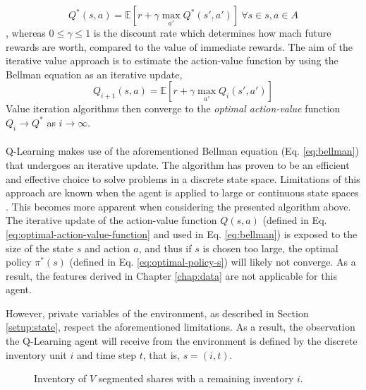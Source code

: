 \begin{equation}\label{eq:bellman}
Q^*(s,a)=\mathbb{E}[r+\gamma \max_{a'} Q^*(s',a')] \ \forall{s}\in{s},  a\in{A}
\end{equation}
, whereas $0 \le \gamma \le 1$ is the discount rate which determines how mach future rewards are worth, compared to the value of immediate rewards.
The aim of the iterative value approach is to estimate the action-value function by using the Bellman equation as an iterative update,
\begin{equation}
Q_{i+1}(s,a)=\mathbb{E}[r+\gamma \max_{a'}Q_{i}(s',a')]
\end{equation}
Value iteration algorithms then converge to the \textit{optimal action-value} function $Q_{i} \rightarrow Q^*$ as $i \rightarrow \infty$. \cite{sutton1998reinforcement}
\\
\\
Q-Learning makes use of the aforementioned Bellman equation (Eq. \ref{eq:bellman}) that undergoes an iterative update.
The algorithm has proven to be an efficient and effective choice to solve problems in a discrete state space.
Limitations of this approach are known when the agent is applied to large or continuous state spaces \cite{gaskett2002q}.
This becomes more apparent when considering the presented algorithm above.
The iterative update of the action-value function $Q(s,a)$ (defined in Eq. \ref{eq:optimal-action-value-function} and used in Eq. \ref{eq:bellman}) is exposed to the size of the state $s$ and action $a$, and thus if $s$ is chosen too large, the optimal policy $\pi^*(s)$ (defined in Eq. \ref{eq:optimal-policy-s}) will likely not converge.
As a result, the features derived in Chapter \ref{chap:data} are not applicable for this agent.

However, private variables of the environment, as described in Section \ref{setup:state}, respect the aforementioned limitations.
As a result, the observation the Q-Learning agent will receive from the environment is defined by the discrete inventory unit $i$ and time step $t$, that is, $s=(i, t)$.

\begin{figure}[H]
    \centering
    \caption{Inventory of $V$ segmented shares with a remaining inventory $i$.}
    \label{fig:setup-inventory}
\end{figure}

